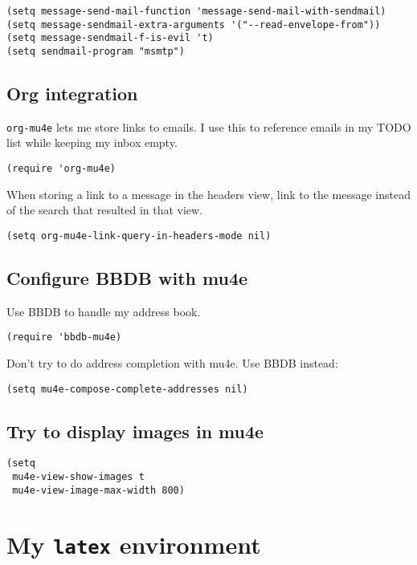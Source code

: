 \documentclass[11pt]{article}
\begin{document}
\begin{verbatim}
(setq message-send-mail-function 'message-send-mail-with-sendmail)
(setq message-sendmail-extra-arguments '("--read-envelope-from"))
(setq message-sendmail-f-is-evil 't)
(setq sendmail-program "msmtp")
\end{verbatim}

\subsection{Org integration}
\label{sec:org2515b6d}

\texttt{org-mu4e} lets me store links to emails. I use this to reference emails in my
TODO list while keeping my inbox empty.

\begin{verbatim}
(require 'org-mu4e)
\end{verbatim}

When storing a link to a message in the headers view, link to the message
instead of the search that resulted in that view.

\begin{verbatim}
(setq org-mu4e-link-query-in-headers-mode nil)
\end{verbatim}
\subsection{Configure BBDB with mu4e}
\label{sec:org8dc4089}

Use BBDB to handle my address book.

\begin{verbatim}
(require 'bbdb-mu4e)
\end{verbatim}

Don’t try to do address completion with mu4e. Use BBDB instead:

\begin{verbatim}
(setq mu4e-compose-complete-addresses nil)
\end{verbatim}
\subsection{Try to display images in mu4e}
\label{sec:org043c99e}

\begin{verbatim}
(setq
 mu4e-view-show-images t
 mu4e-view-image-max-width 800)
\end{verbatim}
\section{My \texttt{latex} environment}
\label{sec:org44e6f80}
\end{document}
